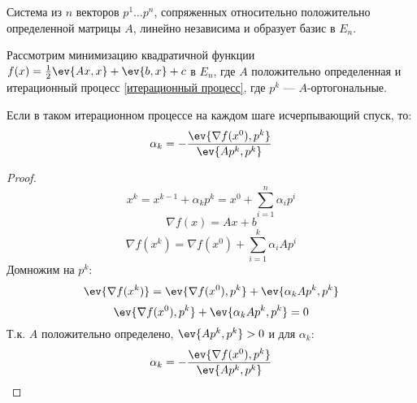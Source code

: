 Система из \(n\) векторов \(p^1 \dots p^n\), сопряженных относительно положительно определенной матрицы \(A\), линейно независима и образует базис в \(E_n\).

Рассмотрим минимизацию квадратичной функции \(f(x) = \frac{1}{2} \ev{Ax, x} + \ev{b, x} + c\) в \(E_n\), где \(A\) положительно определенная и итерационный процесс \eqref{итерационный процесс}, где \(p^k\) --- \(A\)-ортогональные.

Если в таком итерационном процессе на каждом шаге исчерпывающий спуск, то:
\[\alpha_k = -\frac{\ev{\nabla f(x^0), p^k}}{\ev{A p^k, p^k}} \]

\begin{proof}
    \[x^k = x^{k - 1} + \alpha_k p^k = x^0 + \sum_{i = 1}^n \alpha_i p^i\]
    \[\nabla f(x) = Ax + b\]
    \[\nabla f(x^k) = \nabla f(x^0) + \sum_{i = 1}^k \alpha_i A p^i\]
    Домножим на \(p^k\):
    \[\ev{\nabla f(x^k)} = \ev{\nabla f(x^0), p^k} + \ev{\alpha_k A p^k, p^k} \]
    \[\ev{\nabla f(x^0), p^k} + \ev{\alpha_k A p^k, p^k} = 0\]
    Т.к. \(A\) положительно определено, \(\ev{A p^k, p^k} > 0\) и для \(\alpha_k\):
    \[\alpha_k = -\frac{\ev{\nabla f(x^0), p^k}}{\ev{A p^k, p^k}} \]
\end{proof}


